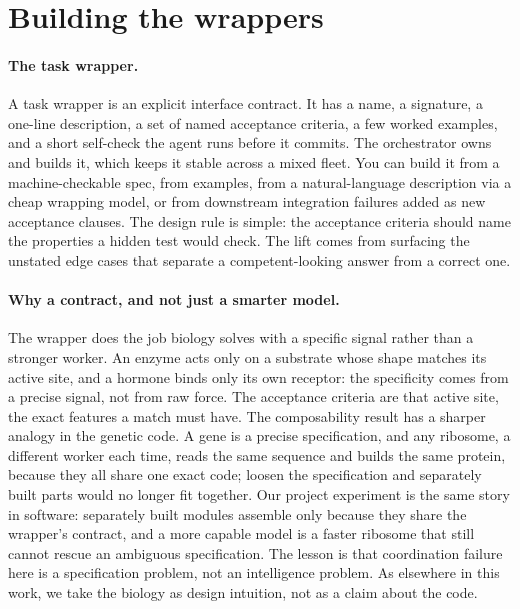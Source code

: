 \documentclass[11pt]{article}
\begin{document}
\section{Building the wrappers}

\paragraph{The task wrapper.} A task wrapper is an explicit interface contract. It has a name, a signature, a one-line description, a set of named acceptance criteria, a few worked examples, and a short self-check the agent runs before it commits. The orchestrator owns and builds it, which keeps it stable across a mixed fleet. You can build it from a machine-checkable spec, from examples, from a natural-language description via a cheap wrapping model, or from downstream integration failures added as new acceptance clauses. The design rule is simple: the acceptance criteria should name the properties a hidden test would check. The lift comes from surfacing the unstated edge cases that separate a competent-looking answer from a correct one.

\paragraph{Why a contract, and not just a smarter model.} The wrapper does the job biology solves with a specific signal rather than a stronger worker. An enzyme acts only on a substrate whose shape matches its active site, and a hormone binds only its own receptor: the specificity comes from a precise signal, not from raw force. The acceptance criteria are that active site, the exact features a match must have. The composability result has a sharper analogy in the genetic code. A gene is a precise specification, and any ribosome, a different worker each time, reads the same sequence and builds the same protein, because they all share one exact code; loosen the specification and separately built parts would no longer fit together. Our project experiment is the same story in software: separately built modules assemble only because they share the wrapper's contract, and a more capable model is a faster ribosome that still cannot rescue an ambiguous specification. The lesson is that coordination failure here is a specification problem, not an intelligence problem. As elsewhere in this work, we take the biology as design intuition, not as a claim about the code.
\end{document}
